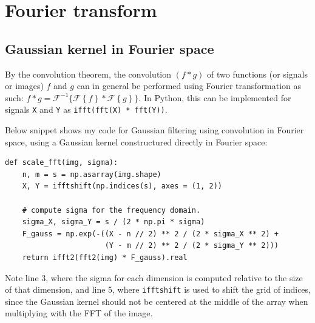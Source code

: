 \section{Fourier transform}

\subsection{Gaussian kernel in Fourier space}

\newcommand{\F}[1]{\mathcal F\left\{#1\right\}}

By the convolution theorem, the convolution $(f \ast g)$ of two functions (or
signals or images) $f$ and $g$ can in general be performed using Fourier
transformation as such: $f \ast g = \mathcal
F^{-1}\{\F{f} * \F{g}\}$. In Python, this can be implemented for signals
\texttt{X} and \texttt{Y} as \texttt{ifft(fft(X) * fft(Y))}.

Below snippet shows my code for Gaussian filtering using convolution in Fourier
space, using a Gaussian kernel constructured directly in Fourier space:

\begin{verbatim}
def scale_fft(img, sigma):
    n, m = s = np.asarray(img.shape)
    X, Y = ifftshift(np.indices(s), axes = (1, 2))

    # compute sigma for the frequency domain.
    sigma_X, sigma_Y = s / (2 * np.pi * sigma)
    F_gauss = np.exp(-((X - n // 2) ** 2 / (2 * sigma_X ** 2) +
                       (Y - m // 2) ** 2 / (2 * sigma_Y ** 2)))
    return ifft2(fft2(img) * F_gauss).real
\end{verbatim}

Note line 3, where the sigma for each dimension is computed relative to the size
of that dimension, and line 5, where \texttt{ifftshift} is used to shift the
grid of indices, since the Gaussian kernel should not be centered at the middle
of the array when multiplying with the FFT of the image.


